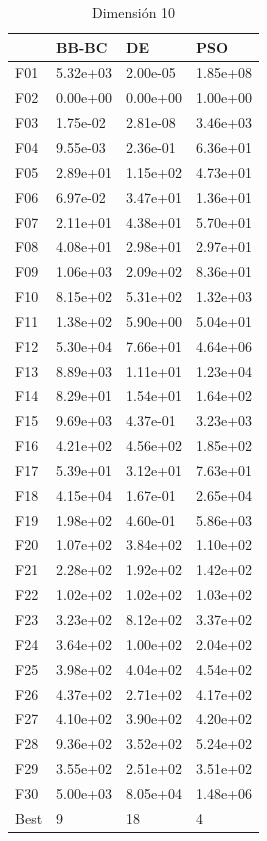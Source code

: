 \begin{table}[H]
    \begin{minipage}{.5\linewidth}
      \caption{Dimensión 10}
      \centering
      \begin{tabular}{llll}
        \toprule
        {} &     BB-BC &        DE &       PSO \\
        \midrule
        F01  &  5.32e+03 &  2.00e-05 &  1.85e+08 \\
        F02  &  0.00e+00 &  0.00e+00 &  1.00e+00 \\
        F03  &  1.75e-02 &  2.81e-08 &  3.46e+03 \\
        F04  &  9.55e-03 &  2.36e-01 &  6.36e+01 \\
        F05  &  2.89e+01 &  1.15e+02 &  4.73e+01 \\
        F06  &  6.97e-02 &  3.47e+01 &  1.36e+01 \\
        F07  &  2.11e+01 &  4.38e+01 &  5.70e+01 \\
        F08  &  4.08e+01 &  2.98e+01 &  2.97e+01 \\
        F09  &  1.06e+03 &  2.09e+02 &  8.36e+01 \\
        F10  &  8.15e+02 &  5.31e+02 &  1.32e+03 \\
        F11  &  1.38e+02 &  5.90e+00 &  5.04e+01 \\
        F12  &  5.30e+04 &  7.66e+01 &  4.64e+06 \\
        F13  &  8.89e+03 &  1.11e+01 &  1.23e+04 \\
        F14  &  8.29e+01 &  1.54e+01 &  1.64e+02 \\
        F15  &  9.69e+03 &  4.37e-01 &  3.23e+03 \\
        F16  &  4.21e+02 &  4.56e+02 &  1.85e+02 \\
        F17  &  5.39e+01 &  3.12e+01 &  7.63e+01 \\
        F18  &  4.15e+04 &  1.67e-01 &  2.65e+04 \\
        F19  &  1.98e+02 &  4.60e-01 &  5.86e+03 \\
        F20  &  1.07e+02 &  3.84e+02 &  1.10e+02 \\
        F21  &  2.28e+02 &  1.92e+02 &  1.42e+02 \\
        F22  &  1.02e+02 &  1.02e+02 &  1.03e+02 \\
        F23  &  3.23e+02 &  8.12e+02 &  3.37e+02 \\
        F24  &  3.64e+02 &  1.00e+02 &  2.04e+02 \\
        F25  &  3.98e+02 &  4.04e+02 &  4.54e+02 \\
        F26  &  4.37e+02 &  2.71e+02 &  4.17e+02 \\
        F27  &  4.10e+02 &  3.90e+02 &  4.20e+02 \\
        F28  &  9.36e+02 &  3.52e+02 &  5.24e+02 \\
        F29  &  3.55e+02 &  2.51e+02 &  3.51e+02 \\
        F30  &  5.00e+03 &  8.05e+04 &  1.48e+06 \\
        Best &         9 &        18 &         4 \\
        \bottomrule
        \end{tabular}
        

\end{minipage}
\end{table}

